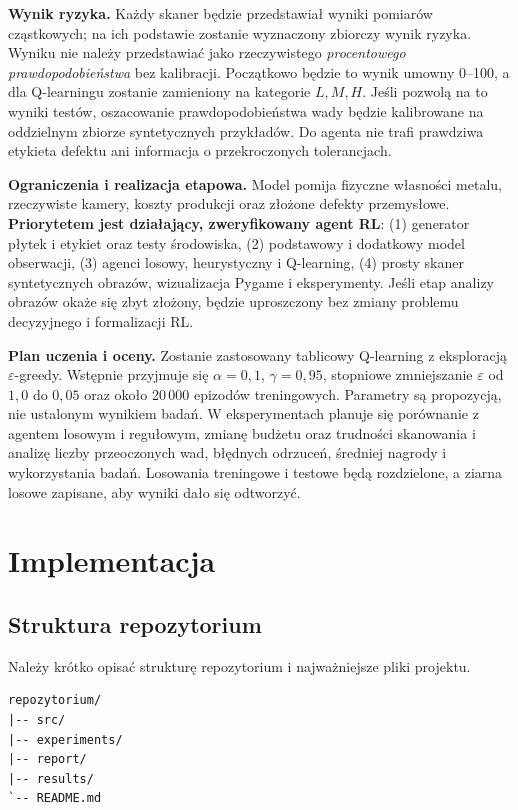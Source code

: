 \documentclass[12pt]{article}
\begin{document}
\textbf{Wynik ryzyka.} Każdy skaner będzie przedstawiał wyniki pomiarów cząstkowych; na ich podstawie zostanie wyznaczony zbiorczy wynik ryzyka. Wyniku nie należy przedstawiać jako rzeczywistego \emph{procentowego prawdopodobieństwa} bez kalibracji. Początkowo będzie to wynik umowny 0--100, a dla Q-learningu zostanie zamieniony na kategorie \(L,M,H\). Jeśli pozwolą na to wyniki testów, oszacowanie prawdopodobieństwa wady będzie kalibrowane na oddzielnym zbiorze syntetycznych przykładów. Do agenta nie trafi prawdziwa etykieta defektu ani informacja o przekroczonych tolerancjach.

\textbf{Ograniczenia i realizacja etapowa.} Model pomija fizyczne własności metalu, rzeczywiste kamery, koszty produkcji oraz złożone defekty przemysłowe. \textbf{Priorytetem jest działający, zweryfikowany agent RL}: (1) generator płytek i etykiet oraz testy środowiska, (2) podstawowy i dodatkowy model obserwacji, (3) agenci losowy, heurystyczny i Q-learning, (4) prosty skaner syntetycznych obrazów, wizualizacja Pygame i eksperymenty. Jeśli etap analizy obrazów okaże się zbyt złożony, będzie uproszczony bez zmiany problemu decyzyjnego i formalizacji RL.

\textbf{Plan uczenia i oceny.} Zostanie zastosowany tablicowy Q-learning z eksploracją \(\varepsilon\)-greedy. Wstępnie przyjmuje się \(\alpha=0{,}1\), \(\gamma=0{,}95\), stopniowe zmniejszanie \(\varepsilon\) od \(1{,}0\) do \(0{,}05\) oraz około 20\,000 epizodów treningowych. Parametry są propozycją, nie ustalonym wynikiem badań. W eksperymentach planuje się porównanie z agentem losowym i regułowym, zmianę budżetu oraz trudności skanowania i analizę liczby przeoczonych wad, błędnych odrzuceń, średniej nagrody i wykorzystania badań. Losowania treningowe i testowe będą rozdzielone, a ziarna losowe zapisane, aby wyniki dało się odtworzyć.

\section{Implementacja}

\subsection{Struktura repozytorium}

Należy krótko opisać strukturę repozytorium i najważniejsze pliki projektu.

\begin{verbatim}
repozytorium/
|-- src/
|-- experiments/
|-- report/
|-- results/
`-- README.md
\end{verbatim}
\end{document}
